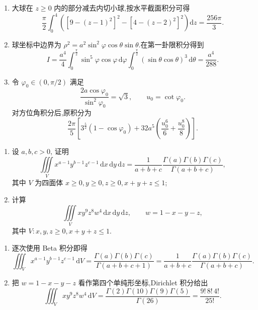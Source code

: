 \begin{solution}
    \leavevmode
    \begin{enumerate}
        \item 大球在 $z\geq0$ 内的部分减去内切小球,按水平截面积分可得
              \[
                  \dfrac{\pi}{2}\int_0^4\left(\left[9-(z-1)^2\right]^2-\left[4-(z-2)^2\right]^2\right)\mathrm{d}z
                  =\dfrac{256\pi}{3}.
              \]
        \item 球坐标中边界为 $\rho^2=a^2\sin^2\varphi\cos\theta\sin\theta$.在第一卦限积分得到
              \[
                  I=\dfrac{a^4}{4}\int_0^{\frac{\pi}{2}}\sin^5\varphi\cos\varphi\,\mathrm{d}\varphi
                  \int_0^{\frac{\pi}{2}}(\sin\theta\cos\theta)^3\,\mathrm{d}\theta
                  =\dfrac{a^4}{288}.
              \]
        \item 令 $\varphi_0\in(0,\pi/2)$ 满足
              \[
                  \dfrac{2a\cos\varphi_0}{\sin^2\varphi_0}=\sqrt3,
                  \qquad u_0=\cot\varphi_0.
              \]
              对方位角积分后,原积分为
              \[
                  \dfrac{2\pi}{5}\left[3^{\frac{5}{2}}(1-\cos\varphi_0)
                      +32a^5\left(\dfrac{u_0^6}{6}+\dfrac{u_0^8}{8}\right)\right].
              \]
    \end{enumerate}
\end{solution}

\begin{example}[\markstar]
    \begin{enumerate}
        \item 设 $a,b,c>0$, 证明
              \[
                  \displaystyle\iiint\limits_Vx^{a-1}y^{b-1}z^{c-1}\,\mathrm{d}x\,\mathrm{d}y\,\mathrm{d}z
                  =\dfrac{1}{a+b+c}\dfrac{\Gamma(a)\Gamma(b)\Gamma(c)}{\Gamma(a+b+c)},
              \]
              其中 $V$ 为四面体 $x\geq0,y\geq0,z\geq0,x+y+z\leq1$;
        \item 计算
              \[
                  \displaystyle\iiint\limits_Vxy^9z^8w^4\,\mathrm{d}x\,\mathrm{d}y\,\mathrm{d}z,
                  \qquad w=1-x-y-z,
              \]
              其中 $V:x,y,z\geq0,x+y+z\leq1$.
    \end{enumerate}
\end{example}
\exampleblank

\begin{solution}
    \leavevmode
    \begin{enumerate}
        \item 逐次使用 Beta 积分即得
              \[
                  \displaystyle\iiint_Vx^{a-1}y^{b-1}z^{c-1}\,\mathrm{d}V
                  =\dfrac{\Gamma(a)\Gamma(b)\Gamma(c)}{\Gamma(a+b+c+1)}
                  =\dfrac{1}{a+b+c}\dfrac{\Gamma(a)\Gamma(b)\Gamma(c)}{\Gamma(a+b+c)}.
              \]
        \item 把 $w=1-x-y-z$ 看作第四个单纯形坐标,Dirichlet 积分给出
              \[
                  \displaystyle\iiint_Vxy^9z^8w^4\,\mathrm{d}V
                  =\dfrac{\Gamma(2)\Gamma(10)\Gamma(9)\Gamma(5)}{\Gamma(26)}
                  =\dfrac{9!\,8!\,4!}{25!}.
              \]
    \end{enumerate}
\end{solution}



